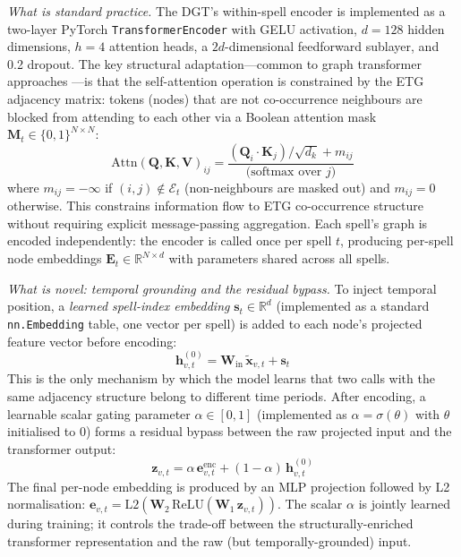 \documentclass[12pt]{article}
\begin{document}
\textit{What is standard practice.} The DGT's within-spell encoder is implemented as a two-layer PyTorch \texttt{TransformerEncoder} \parencite{vaswani2017} with GELU activation, $d = 128$ hidden dimensions, $h = 4$ attention heads, a $2d$-dimensional feedforward sublayer, and 0.2 dropout. The key structural adaptation---common to graph transformer approaches \parencite{rampasek2022}---is that the self-attention operation is constrained by the ETG adjacency matrix: tokens (nodes) that are not co-occurrence neighbours are blocked from attending to each other via a Boolean attention mask $\mathbf{M}_t \in \{0,1\}^{N \times N}$:
\begin{equation}
  \text{Attn}(\mathbf{Q},\mathbf{K},\mathbf{V})_{ij} = \frac{(\mathbf{Q}_i \cdot \mathbf{K}_j) / \sqrt{d_k} + m_{ij}}{\text{(softmax over } j\text{)}}
\end{equation}
where $m_{ij} = -\infty$ if $(i,j) \notin \mathcal{E}_t$ (non-neighbours are masked out) and $m_{ij} = 0$ otherwise. This constrains information flow to ETG co-occurrence structure without requiring explicit message-passing aggregation. Each spell's graph is encoded independently: the encoder is called once per spell $t$, producing per-spell node embeddings $\mathbf{E}_t \in \mathbb{R}^{N \times d}$ with parameters shared across all spells.

\textit{What is novel: temporal grounding and the residual bypass.} To inject temporal position, a \textit{learned spell-index embedding} $\mathbf{s}_t \in \mathbb{R}^d$ (implemented as a standard \texttt{nn.Embedding} table, one vector per spell) is added to each node's projected feature vector before encoding:
\begin{equation}
  \mathbf{h}_{v,t}^{(0)} = \mathbf{W}_{\text{in}}\,\tilde{\mathbf{x}}_{v,t} + \mathbf{s}_t
\end{equation}
This is the only mechanism by which the model learns that two calls with the same adjacency structure belong to different time periods. After encoding, a learnable scalar gating parameter $\alpha \in [0,1]$ (implemented as $\alpha = \sigma(\theta)$ with $\theta$ initialised to 0) forms a residual bypass between the raw projected input and the transformer output:
\begin{equation}
  \mathbf{z}_{v,t} = \alpha\,\mathbf{e}_{v,t}^{\text{enc}} + (1-\alpha)\,\mathbf{h}_{v,t}^{(0)}
\end{equation}
The final per-node embedding is produced by an MLP projection followed by L2 normalisation: $\mathbf{e}_{v,t} = \text{L2}(\mathbf{W}_2 \,\text{ReLU}(\mathbf{W}_1\, \mathbf{z}_{v,t}))$. The scalar $\alpha$ is jointly learned during training; it controls the trade-off between the structurally-enriched transformer representation and the raw (but temporally-grounded) input.
\end{document}
